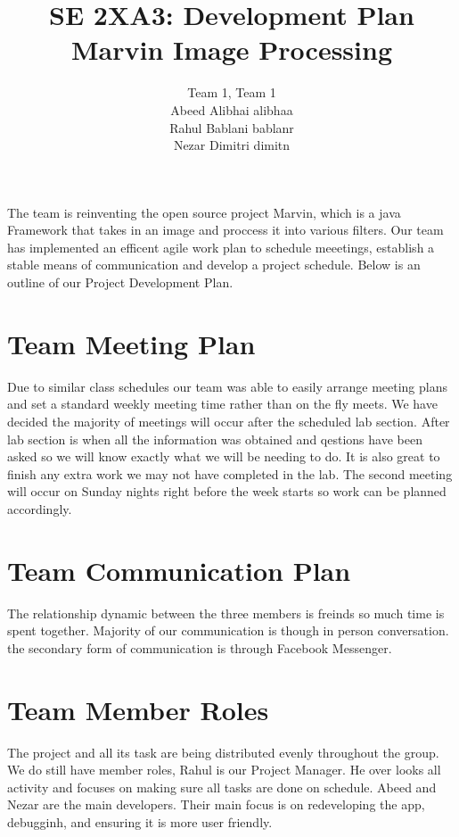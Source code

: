 \documentclass{article}
\begin{document}
\title{SE 2XA3: Development Plan \\ Marvin Image Processing}
\maketitle

\begin{center}
\author{Team 1, Team 1\\Abeed Alibhai alibhaa\\Rahul Bablani bablanr\\Nezar Dimitri dimitn}
\end{center}

The team is reinventing the open source project Marvin, which is a java Framework that takes in an image and proccess it into various filters. Our team has implemented an efficent agile work plan to schedule meeetings, establish a stable means of communication and  develop a project schedule. Below is an outline of our Project Development Plan.

\section{Team Meeting Plan}
Due to similar class schedules our team was able to easily arrange meeting plans and set a standard weekly meeting time rather than on the fly meets. We have decided the majority of meetings will occur after the scheduled lab section. After lab section is when all the information was obtained and qestions have been asked so we will know exactly what we will be needing to do. It is also great to finish any extra work we may not have completed in the lab. The second meeting will occur on Sunday nights right before the week starts so work can be planned accordingly.

\section{Team Communication Plan}
The relationship dynamic between the three members is freinds so much time is spent together. Majority of our communication is though in person conversation. the secondary form of communication is through Facebook Messenger.

\section{Team Member Roles}
The project and all its task are being distributed evenly throughout the group. We do still have member roles, Rahul is our Project Manager. He over looks all activity and focuses on making sure all tasks are done on schedule. Abeed and Nezar are the main developers. Their main focus is on redeveloping the app, debugginh,  and ensuring it is more user friendly.
\end{document}

